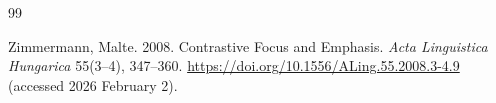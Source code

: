 \documentclass[a4paper, ruler]{CUP-JNL-LIN}%
\begin{document}
\begin{Backmatter}
\begin{thebibliography}{99}

{Zimmermann, Malte}. 2008. Contrastive Focus and Emphasis. \textit{Acta Linguistica Hungarica} 55(3--4), 347--360. \url{https://doi.org/10.1556/ALing.55.2008.3-4.9} (accessed 2026 February 2).

\end{thebibliography}



\end{Backmatter}
\end{document}
